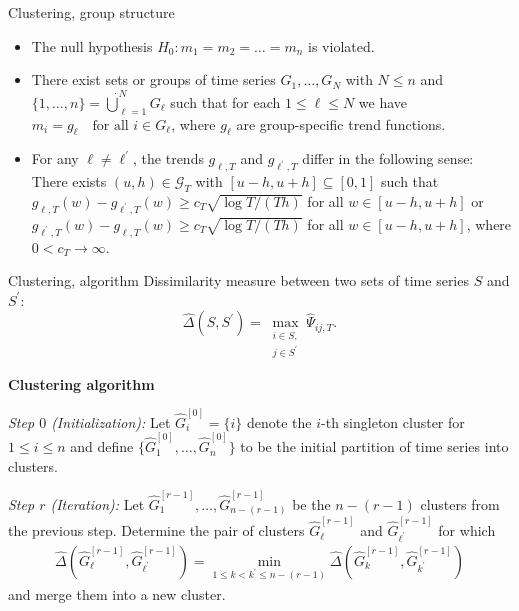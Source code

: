 \documentclass[10pt, handout]{beamer}
\begin{document}
\begin{frame}{Clustering, group structure}
\begin{itemize}
\item The null hypothesis $H_0: m_1 = m_2 = \ldots = m_n$ is violated.
\item There exist sets or groups of time series $G_1,\ldots,G_N$ with $N \le n$ and $\{1,\ldots,n\} = \mathbin{\dot{\bigcup}}_{\ell=1}^{N} G_\ell$ such that for each $1 \le \ell \le N$ we have $m_i = g_\ell \quad \text{for all } i \in G_\ell$, where $g_\ell$ are group-specific trend functions.
\item For any $\ell \ne \ell^\prime$, the trends $g_{\ell,T}$ and $g_{\ell^\prime,T}$ differ in the following sense: There exists $(u,h) \in \mathcal{G}_T$ with $[u-h,u+h] \subseteq [0,1]$ such that $g_{\ell,T}(w) - g_{\ell^\prime,T}(w) \ge c_T \sqrt{\log T/(Th)}$ for all $w \in [u-h,u+h]$ or $g_{\ell^\prime,T}(w) - g_{\ell,T}(w) \ge c_T \sqrt{\log T/(Th)}$ for all $w \in [u-h,u+h]$, where $0 < c_T \rightarrow \infty$.
\end{itemize}
\end{frame}

\begin{frame}{Clustering, algorithm}
Dissimilarity measure between two sets of time series $S$ and $S^{\prime}$:
\begin{equation*}\label{dissimilarity}
\widehat{\Delta}(S,S^\prime) = \max_{\substack{i \in S, \\ j \in S^\prime}} \widehat{\Psi}_{ij,T}. 
\end{equation*}
\begin{center}
\textbf{Clustering algorithm}
\end{center}

\textit{Step $0$ (Initialization):} Let $\widehat{G}_i^{[0]} = \{ i \}$ denote the $i$-th singleton cluster for $1 \le i \le n$ and define $\{\widehat{G}_1^{[0]},\ldots,\widehat{G}_n^{[0]} \}$ to be the initial partition of time series into clusters. 

\noindent \textit{Step $r$ (Iteration):} Let $\widehat{G}_1^{[r-1]},\ldots,\widehat{G}_{n-(r-1)}^{[r-1]}$ be the $n-(r-1)$ clusters from the previous step. Determine the pair of clusters $\widehat{G}_{\ell}^{[r-1]}$ and $\widehat{G}_{{\ell}^\prime}^{[r-1]}$ for which 
\begin{align*}
\widehat{\Delta}(\widehat{G}_{\ell}^{[r-1]},\widehat{G}_{{\ell}^\prime}^{[r-1]}) = \min_{1 \le k < k^\prime \le n-(r-1)} \widehat{\Delta}(\widehat{G}_{k}^{[r-1]},\widehat{G}_{k^\prime}^{[r-1]})
\end{align*}
and merge them into a new cluster. 
\end{frame}
\end{document}

